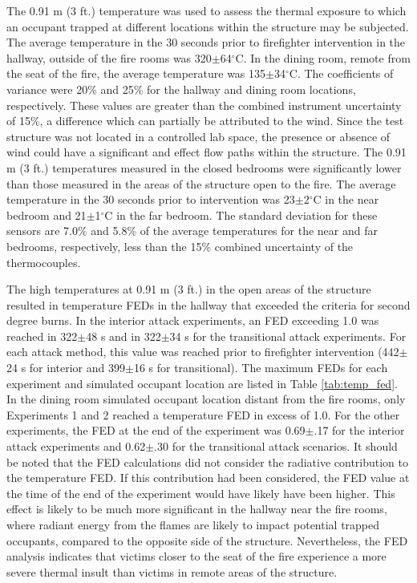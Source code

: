\documentclass[12pt,oneside]{article}
\begin{document}
The 0.91 m (3 ft.) temperature was used to assess the thermal exposure to which an occupant trapped at different locations within the structure may be subjected. The average temperature in the 30 seconds prior to firefighter intervention in the hallway, outside of the fire rooms was 320$\pm$64$^{\circ}$C. In the dining room, remote from the seat of the fire, the average temperature was 135$\pm$34$^{\circ}$C. The coefficients of variance were 20\% and 25\% for the hallway and dining room locations, respectively. These values are greater than the combined instrument uncertainty of 15\%, a difference which can partially be attributed to the wind. Since the test structure was not located in a controlled lab space, the presence or absence of wind could have a significant and effect flow paths within the structure. The 0.91 m (3 ft.) temperatures measured in the closed bedrooms were significantly lower than those measured in the areas of the structure open to the fire. The average temperature in the 30 seconds prior to intervention was 23$\pm$2$^{\circ}$C in the near bedroom and 21$\pm$1$^{\circ}$C in the far bedroom. The standard deviation for these sensors are 7.0\% and 5.8\% of the average temperatures for the near and far bedrooms, respectively, less than the 15\% combined uncertainty of the thermocouples.

The high temperatures at 0.91 m (3 ft.) in the open areas of the structure resulted in temperature FEDs in the hallway that exceeded the criteria for second degree burns. In the interior attack experiments, an FED exceeding 1.0 was reached in 322$\pm$48 s and in 322$\pm$34 s for the transitional attack experiments. For each attack method, this value was reached prior to firefighter intervention (442$\pm$24 s for interior and 399$\pm$16 s for transitional). The maximum FEDs for each experiment and simulated occupant location are listed in Table \ref{tab:temp_fed}. In the dining room simulated occupant location distant from the fire rooms, only Experiments 1 and 2 reached a temperature FED in excess of 1.0. For the other experiments, the FED at  the end of the experiment was 0.69$\pm$.17 for the interior attack experiments and 0.62$\pm$.30 for the transitional attack scenarios. It should be noted that the FED calculations did not consider the radiative contribution to the temperature FED. If this contribution had been considered, the FED value at the time of the end of the experiment would have likely have been higher. This effect is likely to be much more significant in the hallway near the fire rooms, where radiant energy from the flames are likely to impact potential trapped occupants, compared to the opposite side of the structure. Nevertheless, the FED analysis indicates that victims closer to the seat of the fire experience a more severe thermal insult than victims in remote areas of the structure.
\end{document}

